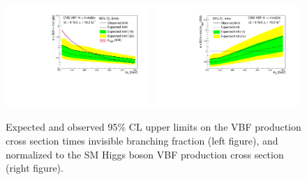 \begin{figure}[!htp]
\centering
\includegraphics[width=0.49\textwidth]{Chapter05/Images/vbfxslimit.pdf}
\includegraphics[width=0.49\textwidth]{Chapter05/Images/vbflimit.pdf}
\caption{Expected and observed 95\% CL upper limits on the VBF production cross section times invisible branching fraction (left figure), and normalized to the \gls{SM} Higgs boson \gls{VBF} production cross section (right figure). \cite{ARTICLE:CMSVBFHiggsToInvAndZHCombination}}
\label{FIGURE:PromptDataAnalysis_VBFLimit}
\end{figure}
